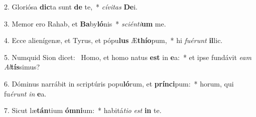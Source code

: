 2. Gloriósa \textbf{dic}ta sunt \textbf{de} te,~*  \textit{cí}\textit{vi}\textit{tas} \textbf{De}i.\

3. Memor ero Rahab, et \textbf{Ba}by\textbf{ló}nis~*  \textit{sci}\textit{én}\textit{ti}\textbf{um} me.\

4. Ecce alienígenæ, et Tyrus, et pópu\textbf{lus} Æ\textbf{thí}\textbf{o}pum,~*  hi \textit{fu}\textit{é}\textit{runt} \textbf{il}lic.\

5. Numquid Sion dicet: \dag\  Homo, et homo natus \textbf{est} in \textbf{e}a:~*  et ipse fundávit \textit{e}\textit{am} \textit{Al}\textbf{tís}simus?\

6. Dóminus narrábit in scriptúris popu\textbf{ló}rum, et \textbf{prín}\textbf{ci}pum:~*  horum, qui fu\textit{é}\textit{runt} \textit{in} \textbf{e}a.\

7. Sicut læ\textbf{tán}tium \textbf{óm}\textbf{ni}um:~*  habitá\textit{ti}\textit{o} \textit{est} \textbf{in} te.\

